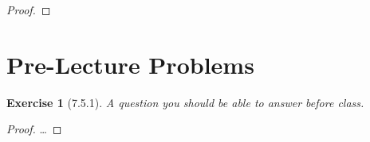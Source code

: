 \documentclass[12pt]{article}
\newtheorem*{exer}{Exercise}
\begin{document}
\begin{proof}
\end{proof}

\section*{Pre-Lecture Problems}

\begin{exer}[7.5.1]

    A question you should be able to answer before class.

\end{exer}

\begin{proof}

    \dots

\end{proof}

\end{document}
